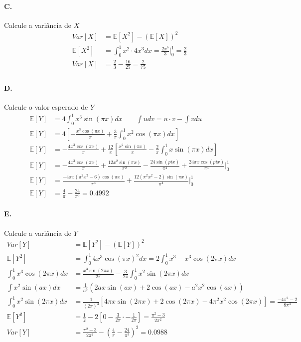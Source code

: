 \documentclass{article}
\begin{document}
\paragraph*{C.} Calcule a variância de $X$
\begin{align*}
    Var[X] &= \mathbb{E}[X^2] - (\mathbb{E}[X])^2 \\
    \mathbb{E}[X^2] &= \int_0^1 x^2 \cdot 4x^3 dx = \frac{2x^6}{3} \bigg\rvert_{0}^{1} = \frac{2}{3} \\
    Var[X] &= \frac{2}{3} - \frac{16}{25} = \frac{2}{75} \\
\end{align*}

\paragraph*{D.} Calcule o valor esperado de $Y$
\begin{align*}
    \mathbb{E}[Y] &= 4 \int_0^1 x^3 \sin(\pi x) dx \qquad \int u dv = u\cdot v - \int v du \\
    \mathbb{E}[Y] &= 4 \left[ -\frac{x^3 \cos(\pi x)}{\pi} + \frac{3}{\pi} \int_0^1 x^2 \cos(\pi
    x) dx \right] \\
    \mathbb{E}[Y] &= -\frac{4x^3 \cos(\pi x)}{\pi} + \frac{12}{\pi} \left[ \frac{x^2 \sin(\pi
    x)}{\pi} -\frac{2}{\pi} \int_0^1 x \sin(\pi x)dx \right] \\
    \mathbb{E}[Y] &= -\frac{4x^3 \cos(\pi x)}{\pi} + \frac{12x^2 \sin(\pi x)}{\pi^2} -\frac{24
    \sin(pi x)}{\pi^4} + \frac{24 \pi x \cos(pi x)}{\pi^4} \bigg\rvert_{0}^{1} \\
    \mathbb{E}[Y] &= \frac{-4 \pi x(\pi^2x^2-6) \cos(\pi x)}{\pi^4} + \frac{12(\pi^2x^2-2)
    \sin(\pi x)}{\pi^4} \bigg\rvert_{0}^{1} \\
    \mathbb{E}[Y] &= \frac{4}{\pi} - \frac{24}{\pi^3} = 0.4992
\end{align*}
\paragraph*{E.} Calcule a variância de $Y$
\begin{align*}
    Var[Y] &= \mathbb{E}[Y^2] - (\mathbb{E}[Y])^2 \\
    \mathbb{E}[Y^2] &= \int_0^1 4x^3 \cos(\pi x)^2 dx = 2 \int_0^1 x^3 - x^3 \cos(2 \pi x) dx \\
    \int_0^1 x^3 \cos(2 \pi x) dx &= \frac{x^3 \sin(2 \pi x)}{2 \pi} - \frac{3}{2 \pi} \int_0^1
    x^2 \sin(2 \pi x) dx \\
    \int x^2 \sin(ax) dx &= \frac{1}{a^3} \left(2ax \sin(ax) + 2 \cos(ax) -a^2x^2 \cos(ax)
    \right) \\
    \int_0^1 x^2 \sin(2 \pi x) dx &= \frac{1}{(2 \pi)^3} \left[ 4 \pi x \sin(2 \pi x) +2
    \cos(2\pi x) -4 \pi^2x^2 \cos(2 \pi x) \right] = \frac{-4 \pi^2 - 2}{8 \pi^3} \\
    \mathbb{E}[Y^2] &= \frac{1}{2} - 2 [0 -\frac{3}{2 \pi} \cdot -\frac{1}{2 \pi}] =
    \frac{\pi^2 - 3}{2 \pi^2} \\
    Var[Y] &= \frac{\pi^2 - 3}{2 \pi^2} - \left( \frac{4}{\pi} - \frac{24}{\pi^3} \right)^2 =
    0.0988  \\
\end{align*}
\end{document}
